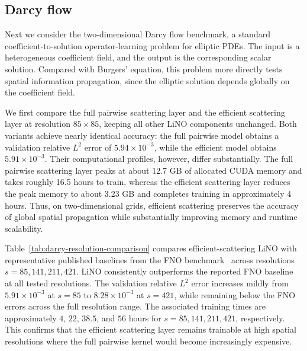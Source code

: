 \documentclass{article}
\begin{document}
\subsection{Darcy flow}

Next we consider the two-dimensional Darcy flow benchmark, a standard coefficient-to-solution operator-learning problem for elliptic PDEs. 
The input is a heterogeneous coefficient field, and the output is the corresponding scalar solution. 
Compared with Burgers' equation, this problem more directly tests spatial information propagation, since the elliptic solution depends globally on the coefficient field.

We first compare the full pairwise scattering layer and the efficient scattering layer at resolution $85\times85$, keeping all other LiNO components unchanged. 
Both variants achieve nearly identical accuracy: the full pairwise model obtains a validation relative $L^2$ error of $5.94\times10^{-3}$, while the efficient model obtains $5.91\times10^{-3}$. 
Their computational profiles, however, differ substantially. 
The full pairwise scattering layer peaks at about 12.7 GB of allocated CUDA memory and takes roughly 16.5 hours to train, whereas the efficient scattering layer reduces the peak memory to about 3.23 GB and completes training in approximately 4 hours.
Thus, on two-dimensional grids, efficient scattering preserves the accuracy of global spatial propagation while substantially improving memory and runtime scalability.

Table~\ref{tab:darcy-resolution-comparison} compares efficient-scattering LiNO with representative published baselines from the FNO benchmark~\cite{li2021fno} across resolutions $s=85,141,211,421$. 
LiNO consistently outperforms the reported FNO baseline at all tested resolutions. 
The validation relative $L^2$ error increases mildly from $5.91\times10^{-3}$ at $s=85$ to $8.28\times10^{-3}$ at $s=421$, while remaining below the FNO errors across the full resolution range. 
The associated training times are approximately $4$, $22$, $38.5$, and $56$ hours for $s=85,141,211,421$, respectively. 
This confirms that the efficient scattering layer remains trainable at high spatial resolutions where the full pairwise kernel would become increasingly expensive.
\end{document}
